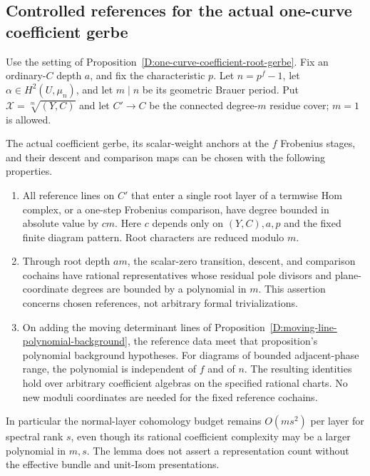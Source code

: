 \subsection{Controlled references for the actual one-curve coefficient gerbe}

\begin{lemma}
\label{D:controlled-one-curve-gerbe-anchors}
Use the setting of Proposition~\ref{D:one-curve-coefficient-root-gerbe}.
Fix an ordinary-$C$ depth $a$, and fix the characteristic $p$.
Let $n=p^f-1$, let $\alpha\in H^2(U,\mu_n)$, and let $m\mid n$
be its geometric Brauer period. Put
$\mathcal X=\sqrt[m]{(Y,C)}$ and let $C'\to C$ be the connected
degree-$m$ residue cover; $m=1$ is allowed.

The actual coefficient gerbe, its scalar-weight anchors at the
$f$ Frobenius stages, and their descent and comparison maps can
be chosen with the following properties.
\begin{enumerate}
\item All reference lines on $C'$ that enter a single root
layer of a termwise Hom complex, or a one-step Frobenius
comparison, have degree bounded in absolute value by $c m$.
Here $c$ depends only on $(Y,C),a,p$ and the fixed finite
diagram pattern. Root characters are reduced modulo $m$.
\item Through root depth $am$, the scalar-zero transition,
descent, and comparison cochains have rational representatives
whose residual pole divisors and plane-coordinate degrees are
bounded by a polynomial in $m$. This assertion concerns chosen
references, not arbitrary formal trivializations.
\item On adding the moving determinant lines of
Proposition~\ref{D:moving-line-polynomial-background}, the
reference data meet that proposition's polynomial background
hypotheses. For diagrams of bounded adjacent-phase range, the
polynomial is independent of $f$ and of $n$. The resulting
identities hold over arbitrary coefficient algebras on the
specified rational charts. No new moduli coordinates are needed
for the fixed reference cochains.
\end{enumerate}
In particular the normal-layer cohomology budget remains
$O(ms^2)$ per layer for spectral rank $s$, even though its
rational coefficient complexity may be a larger polynomial
in $m,s$. The lemma does not assert a representation count
without the effective bundle and unit-Isom presentations.
\end{lemma}

